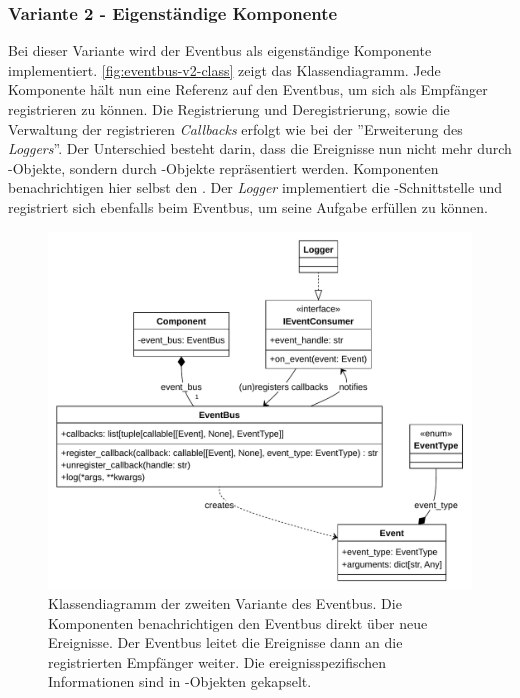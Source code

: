 \subsubsection*{Variante 2 - Eigenständige Komponente}

Bei dieser Variante wird der Eventbus als eigenständige Komponente implementiert. \autoref{fig:eventbus-v2-class} zeigt das Klassendiagramm. Jede Komponente hält nun eine Referenz auf den Eventbus, um sich als Empfänger registrieren zu können. Die Registrierung und Deregistrierung, sowie die Verwaltung der registrieren \emph{Callbacks} erfolgt wie bei der ''Erweiterung des \emph{Loggers}''. Der Unterschied besteht darin, dass die Ereignisse nun nicht mehr durch -Objekte, sondern durch -Objekte repräsentiert werden. Komponenten benachrichtigen hier selbst den . Der \emph{Logger} implementiert die -Schnittstelle und registriert sich ebenfalls beim Eventbus, um seine Aufgabe erfüllen zu können.

\begin{figure}[!ht]
	\centering
	\includegraphics[width=1.0\linewidth]{images/diagrams/eventbus-v2-class.pdf}
	\caption{Klassendiagramm der zweiten Variante des Eventbus. Die Komponenten benachrichtigen den Eventbus direkt über neue Ereignisse. Der Eventbus leitet die Ereignisse dann an die registrierten Empfänger weiter. Die ereignisspezifischen Informationen sind in -Objekten gekapselt.}
	\label{fig:eventbus-v2-class}
\end{figure}

